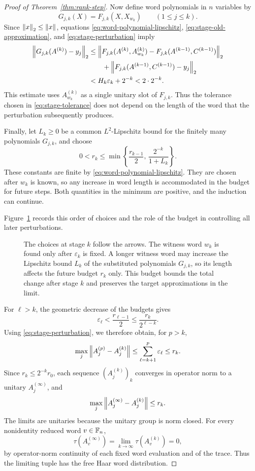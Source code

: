 \begin{proof}[Proof of Theorem~\ref{thm:rank-step}]
Now define word polynomials in $n$ variables by
\[
 G_{j,k}(X)=F_{j,k}(X,X_{w_k})
 \qquad(1\leq j\leq k).
\]
Since $\left\lVert x\right\rVert_2\leq\left\lVert x\right\rVert$, equations
\eqref{eq:word-polynomial-lipschitz},
\eqref{eq:stage-old-approximation}, and
\eqref{eq:stage-perturbation} imply
\begin{align}
\label{eq:stage-new-approximation}
 \left\lVert G_{j,k}(A^{(k)})-y_j\right\rVert_2
 &\leq
 \left\lVert F_{j,k}(A^{(k)},A_{w_k}^{(k)})
       -F_{j,k}(A^{(k-1)},C^{(k-1)})\right\rVert_2
 \notag\\
 &\qquad
 +\left\lVert F_{j,k}(A^{(k-1)},C^{(k-1)})-y_j\right\rVert_2
 \notag\\
 &<H_k\varepsilon_k+2^{-k}<2\cdot2^{-k}.
\end{align}
This estimate uses $A_{w_k}^{(k)}$ as a single unitary slot of
$F_{j,k}$.  Thus the tolerance chosen in
\eqref{eq:stage-tolerance} does not depend on the length of the word
that the perturbation subsequently produces.

Finally, let $L_k\geq0$ be a common $L^2$-Lipschitz bound for the
finitely many polynomials $G_{j,k}$, and choose
\begin{equation}
\label{eq:future-budget}
 0<r_k\leq
 \min\left\{\frac{r_{k-1}}2,\,
                  \frac{2^{-k}}{1+L_k}\right\}.
\end{equation}
These constants are finite by
\eqref{eq:word-polynomial-lipschitz}.  They are chosen after $w_k$
is known, so any increase in word length is accommodated in the
budget for future steps.  Both quantities in the minimum are
positive, and the induction can continue.

Figure~\ref{fig:iteration} records this order of choices and the
role of the budget in controlling all later perturbations.
\begin{figure}[htbp]
\centering

\caption{The choices at stage $k$ follow the arrows.  The witness
word $w_k$ is found only after $\varepsilon_k$ is fixed.  A longer
witness word may increase the Lipschitz bound $L_k$ of the substituted
polynomials $G_{j,k}$, so its length affects the future budget $r_k$
only.  This budget bounds the total change after stage $k$ and
preserves the target approximations in the limit.}
\label{fig:iteration}
\end{figure}

For $\ell>k$, the geometric decrease of the budgets gives
\[
 \varepsilon_\ell<\frac{r_{\ell-1}}2
       \leq \frac{r_k}{2^{\ell-k}}.
\]
Using \eqref{eq:stage-perturbation}, we therefore obtain, for $p>k$,
\[
 \max_j\left\lVert A_j^{(p)}-A_j^{(k)}\right\rVert
 \leq\sum_{\ell=k+1}^{p}\varepsilon_\ell
 \leq r_k.
\]
Since $r_k\leq2^{-k}r_0$, each sequence $(A_j^{(k)})_k$ converges in
operator norm to a unitary $A_j^{(\infty)}$, and
\begin{equation}
\label{eq:generator-tail}
 \max_j\left\lVert A_j^{(\infty)}-A_j^{(k)}\right\rVert\leq r_k.
\end{equation}
The limits are unitaries because the unitary group is norm closed.
For every nonidentity reduced word $v\in\mathbb F_n$,
\[
 \tau(A_v^{(\infty)})
   =\lim_{k\to\infty}\tau(A_v^{(k)})=0,
\]
by operator-norm continuity of each fixed word evaluation and of
the trace.  Thus the limiting tuple has the free Haar word
distribution.


\end{proof}
